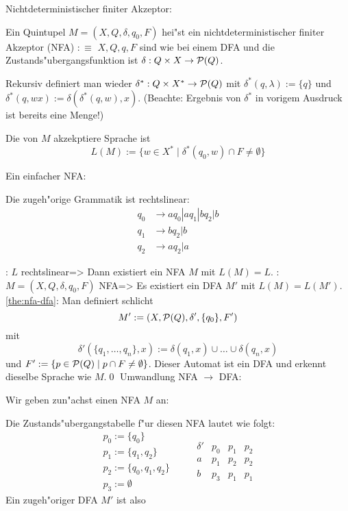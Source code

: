  Nichtdeterministischer finiter Akzeptor:{
%
%
%
%
%
%
  Ein Quintupel $M=(X,Q,\delta,q_0,F)$ hei"st ein
  nichtdeterministischer finiter Akzeptor (NFA) $:\equiv$
  $X, Q, q, F$ sind wie bei einem DFA und die Zustands"ubergangsfunktion 
  ist $\delta:Q\times X\to \cal P(Q)$.
  
  Rekursiv definiert man wieder
  $\delta^*:Q\times X^*\to \cal P(Q)$ mit $\delta^*(q,\lambda):=\{q\}$ und 
  $\delta^*(q,wx):=\delta(\delta^*(q, w),x)$. (Beachte: Ergebnis von 
  $\delta^*$ in vorigem Ausdruck ist bereits eine Menge!)

  Die von $M$ akzekptiere Sprache ist
  \[L(M):= \{w\in X^*\mid\delta^*(q_0, w)\cap F\ne\emptyset\}
    \]
  }
\example Ein einfacher NFA:{
  
  Die zugeh"orige Grammatik ist rechtslinear:
  \begin{align*}
    q_0 &\to aq_0 | aq_1 | bq_2 | b\\
    q_1 &\to bq_2 | b\\
    q_2 &\to aq_2 | a
    \end{align*}
  }
\theorem: $L$ rechtslinear=>{
  Dann existiert ein NFA $M$ mit $L(M)=L$.
  }
\theorem:$M=(X,Q,\delta,q_0,F)$ NFA=>{
  \label{the:nfa-dfa}
  Es existiert ein DFA $M'$ mit $L(M) = L(M')$.
  }
\proof\ref{the:nfa-dfa}:{
  Man definiert schlicht
  \[M':=(X, \cal P(Q),\delta',\{q_0\},F')
    \]
  mit 
  \[\delta'(\{q_1,\ldots,q_n\},x):=\delta(q_1, x)\cup\ldots\cup\delta(q_n,x)
    \] 
  und $F':=\{p\in\cal P(Q)\mid p\cap F\ne\emptyset\}$. 
  Dieser Automat ist ein DFA und erkennt dieselbe Sprache wie $M$.\qed
  }
\example Umwandlung NFA $\to$ DFA:{
  Wir geben zun"achst einen NFA $M$ an:
  
  Die Zustands"ubergangstabelle f"ur diesen NFA lautet wie folgt:
  \[\begin{array}{l}
      p_0 := \{q_0\}\\
      p_1 := \{q_1, q_2\}\\
      p_2 := \{q_0, q_1, q_2\}\\
      p_3 := \emptyset
      \end{array}
      \qquad
      \begin{array}{c|ccc}
       	\delta' & p_0 & p_1 & p_2 \\\hline
       	a & p_1 & p_2 & p_2 \\
       	b & p_3 & p_1 & p_1
      \end{array}
    \]
  Ein zugeh"origer DFA $M'$ ist also
  
  }
